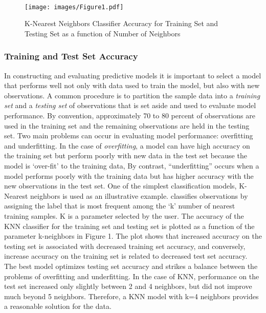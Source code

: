 \\\documentclass[sigconf]{acmart}
\begin{document}
 \begin{figure}[!ht]
  \centering\texttt{[image: images/Figure1.pdf]}
  \caption{K-Nearest Neighbors Classifier Accuracy for Training Set and 
  Testing Set as a function of Number of Neighbors}
  \label{f:Figure1}
\end{figure}


\subsubsection{Training and Test Set Accuracy}

In constructing and evaluating predictive models it is important to select 
a model that performs well not only with data used to train the model, but 
also with new observations. A common procedure is to partition the sample data
into a \emph{training set} and a \emph{testing set} of observations that is 
set aside and used to evaluate model performance. By convention, 
approximately 70 to 80 percent of observations are used in the training set 
and the remaining observations are held in the testing set. Two main problems 
can occur in evaluating model performance: overfitting and underfitting. 
In the case of \emph{overfitting}, a model can have high accuracy on the 
training set but perform poorly with new data in the test set because the 
model is `over-fit' to the training data, By contrast, ``underfitting'' 
occurs when a model performs poorly with the training data but has higher 
accuracy with the new observations in the test set. One of the simplest 
classification models, K-Nearest neighbors is used as an illustrative example. 
classifies observations by assigning the label that is most frequent among the 
`k' number of nearest training samples. K is a parameter selected by the user. 
The accuracy of the KNN classifier for the training set and testing set is 
plotted as a function of the parameter k-neighbors in Figure 1. The plot 
shows that increased accuracy on the testing set is associated with 
decreased training set accuracy, and conversely, increase accuracy on the
training set is related to decreased test set accuracy. The best model 
optimizes testing set accuracy and strikes a balance between the problems of 
overfitting and underfitting. In the case of KNN, performance on the test set 
increased only slightly between 2 and 4 neighbors, but did not improve much 
beyond 5 neighbors. Therefore, a KNN model with k=4 neighbors provides 
a reasonable solution for the data. 
\end{document}

